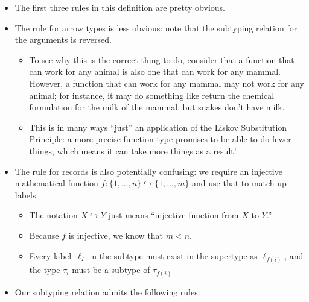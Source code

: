 \documentclass{lecturenotes}
\newcommand{\utype}{\textsf{unit}\xspace}
\newcommand{\prodtype}[2]{\ensuremath{#1 \times #2}}
\newcommand{\sumtype}[2]{\ensuremath{#1 + #2}}
\newcommand{\subtype}{\ensuremath{\mathrel{\mathord{<}\mathord{:}}}}
\begin{document}

\begin{itemize}
\item The first three rules in this definition are pretty obvious.
\item The rule for arrow types is less obvious: note that the subtyping relation for the arguments is reversed.
  \begin{itemize}
  \item To see why this is the correct thing to do, consider that a function that can work for any animal is also one that can work for any mammal.
    However, a function that can work for any mammal may not work for any animal; for instance, it may do something like return the chemical formulation for the milk of the mammal, but snakes don't have milk.
  \item This is in many ways ``just'' an application of the Liskov Substitution Principle: a more-precise function type promises to be able to do fewer things, which means it can take more things as a result!
  \end{itemize}
\item The rule for records is also potentially confusing: we require an injective mathematical function $f : \{1, \dots, n\} \hookrightarrow \{1, \dots, m\}$ and use that to match up labels.
  \begin{itemize}
  \item The notation $X \hookrightarrow Y$ just means ``injective function from $X$ to $Y$.''
  \item Because $f$ is injective, we know that $m < n$.
  \item Every label~$\ell_I$ in the subtype must exist in the supertype as $\ell_{f(i)}$, and the type $\tau_i$ must be a subtype of $\tau_{f(i)}$
  \end{itemize}
\item Our subtyping relation admits the following rules:
\end{itemize}
\end{document}
